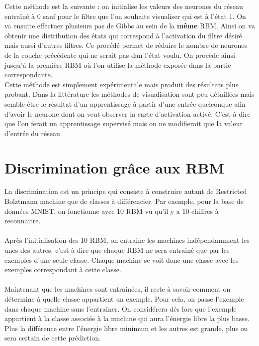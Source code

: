 \documentclass[a4paper,oneside]{report}
\begin{document}
Cette méthode est la suivante : on initialise les valeurs des neurones du réseau entraîné à 0 sauf pour le filtre que l'on souhaite visualiser qui est à l'état 1. On va ensuite effectuer plusieurs pas de Gibbs au sein de la \textbf{même} RBM. Ainsi on va obtenir une distribution des états qui correspond à l'activation du filtre désiré mais aussi d'autres filtres. Ce procédé permet de réduire le nombre de neurones de la couche précédente qui ne serait pas dan l'état voulu. On procède ainsi jusqu'à la première RBM où l'on utilise la méthode exposée dans la partie correspondante.\\

Cette méthode est simplement expérimentale mais produit des résultats plus probant. Dans la littérature les méthodes de visualisation sont peu détaillées mais semble être le résultat d'un apprentissage à partir d'une entrée quelconque afin d'avoir le neurone dont on veut observer la carte d'activation activé. C'est à dire que l'on ferait un apprentissage supervisé mais on ne modifierait que la valeur d'entrée du réseau.


\section{Discrimination grâce aux RBM}

La discrimination est un principe qui consiste à construire autant de Restricted Bolztmann machine que de classes à différencier. Par exemple, pour la base de données MNIST, on fonctionne avec 10 RBM vu qu'il y a 10 chiffres à reconnaitre.

\paragraph{} Après l'initialisation des 10 RBM, on entraine les machines indépendamment les unes des autres. c'est à dire que chaque RBM ne sera entrainé que par les exemples d'une seule classe. Chaque machine se voit donc une classe avec les exemples correspondant à cette classe.

\paragraph{} Maintenant que les machines sont entrainées, il reste à savoir comment on détermine à quelle classe appartient un exemple. Pour cela, on passe l'exemple dans chaque machine sans l'entrainer. On considérera dés lors que l'exemple appartient à la classe associée à la machine qui aura l'énergie libre la plus basse. Plus la différence entre l'énergie libre minimum et les autres est grande, plus on sera certain de cette prédiction.\\
\end{document}
